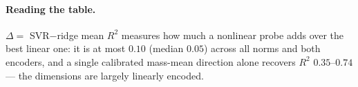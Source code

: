 \paragraph{Reading the table.}
$\Delta=$ SVR$-$ridge mean $R^2$ measures how much a nonlinear probe adds over
the best linear one: it is at most $0.10$ (median $0.05$) across all norms and
both encoders, and a single calibrated mass-mean direction alone recovers
$R^2$ $0.35$--$0.74$ --- the dimensions are largely linearly encoded.


